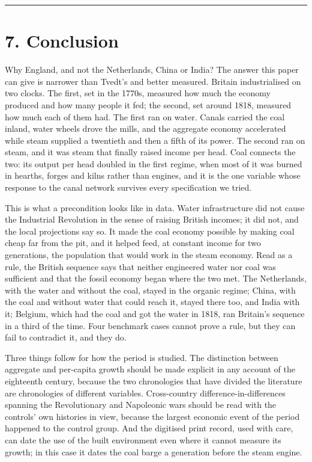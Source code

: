 \documentclass[
  11pt,
]{article}
\begin{document}
\begin{center}\rule{0.5\linewidth}{0.5pt}\end{center}

\section{7. Conclusion}\label{conclusion}

Why England, and not the Netherlands, China or India? The answer this
paper can give is narrower than Tvedt's and better measured. Britain
industrialised on two clocks. The first, set in the 1770s, measured how
much the economy produced and how many people it fed; the second, set
around 1818, measured how much each of them had. The first ran on water.
Canals carried the coal inland, water wheels drove the mills, and the
aggregate economy accelerated while steam supplied a twentieth and then
a fifth of its power. The second ran on steam, and it was steam that
finally raised income per head. Coal connects the two: its output per
head doubled in the first regime, when most of it was burned in hearths,
forges and kilns rather than engines, and it is the one variable whose
response to the canal network survives every specification we tried.

This is what a precondition looks like in data. Water infrastructure did
not cause the Industrial Revolution in the sense of raising British
incomes; it did not, and the local projections say so. It made the coal
economy possible by making coal cheap far from the pit, and it helped
feed, at constant income for two generations, the population that would
work in the steam economy. Read as a rule, the British sequence says
that neither engineered water nor coal was sufficient and that the
fossil economy began where the two met. The Netherlands, with the water
and without the coal, stayed in the organic regime; China, with the coal
and without water that could reach it, stayed there too, and India with
it; Belgium, which had the coal and got the water in 1818, ran Britain's
sequence in a third of the time. Four benchmark cases cannot prove a
rule, but they can fail to contradict it, and they do.

Three things follow for how the period is studied. The distinction
between aggregate and per-capita growth should be made explicit in any
account of the eighteenth century, because the two chronologies that
have divided the literature are chronologies of different variables.
Cross-country difference-in-differences spanning the Revolutionary and
Napoleonic wars should be read with the controls' own histories in view,
because the largest economic event of the period happened to the control
group. And the digitised print record, used with care, can date the use
of the built environment even where it cannot measure its growth; in
this case it dates the coal barge a generation before the steam engine.
\end{document}

